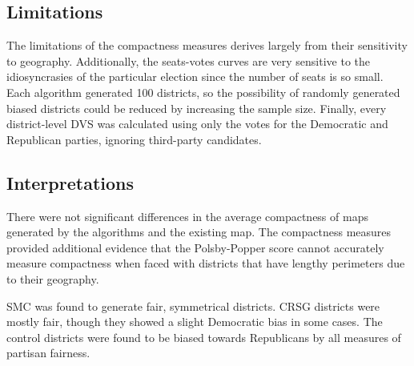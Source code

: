 \subsection{Limitations}

The limitations of the compactness measures derives largely from their sensitivity to geography. Additionally, the seats-votes curves are very sensitive to the idiosyncrasies of the particular election since the number of seats is so small. Each algorithm generated 100 districts, so the possibility of randomly generated biased districts could be reduced by increasing the sample size. Finally, every district-level DVS was calculated using only the votes for the Democratic and Republican parties, ignoring third-party candidates.

\subsection{Interpretations}

There were not significant differences in the average compactness of maps generated by the algorithms and the existing map. The compactness measures provided additional evidence that the Polsby-Popper score cannot accurately measure compactness when faced with districts that have lengthy perimeters due to their geography. 

SMC was found to generate fair, symmetrical districts. CRSG districts were mostly fair, though they showed a slight Democratic bias in some cases. The control districts were found to be biased towards Republicans by all measures of partisan fairness. 